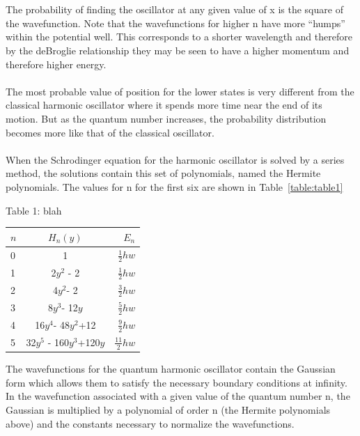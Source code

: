 \documentclass{article}
\begin{document}
\\
\\
The probability of finding the oscillator at any given value of x is the square of the wavefunction. Note that the wavefunctions for higher n have more “humps” within the potential well. This corresponds to a shorter wavelength and therefore by the deBroglie relationship they may be seen to have a higher momentum and therefore higher energy.
\\
\\
The most probable value of position for the lower states is very different from the classical harmonic oscillator where it spends more time near the end of its motion. But as the quantum number increases, the probability distribution becomes more like that of the classical oscillator.
\\
\\
When the Schrodinger equation for the harmonic oscillator is solved by a series method, the solutions contain this set of polynomials, named the Hermite polynomials. The values for n for the first six are shown in Table~\ref{table:table1}



\begin{center}
Table 1: blah
\\	

\begin{tabular}{l c r }	
\hline	
\hline
$n$	& $H_n(y)$   &          $E_n$\\	
\hline
0 & 1 & $\frac{1}{2}hw$\\
1 & 2$y^2$ - 2& $\frac{1}{2}hw$\\
2 & 4$y^2$- 2 & $\frac{3}{2}hw$\\
3 & 8$y^3$- 12$y$ & $\frac{5}{2}hw$\\
4 & 16$y^4$- 48$y^2$+12& $\frac{9}{2}hw$\\
5 & 32$y^5$ - 160$y^3$+120$y$ & $\frac{11}{2}hw$\\
\hline
\hline
\end{tabular}
\label{table:table1}
\end{center}

The wavefunctions for the quantum harmonic oscillator contain the Gaussian form which allows them to satisfy the necessary boundary conditions at infinity. In the wavefunction associated with a given value of the quantum number n, the Gaussian is multiplied by a polynomial of order n (the Hermite polynomials above) and the constants necessary to normalize the wavefunctions.
\end{document}
